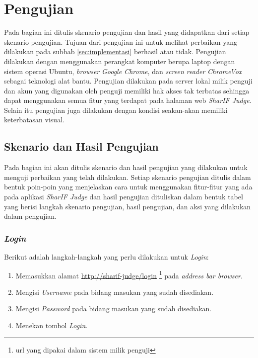 \section{Pengujian}
\label{sec:pengujian}
Pada bagian ini ditulis skenario pengujian dan hasil yang didapatkan dari setiap skenario pengujian. Tujuan dari pengujian ini untuk melihat perbaikan yang dilakukan pada subbab \ref{sec:implementasi} berhasil atau tidak. Pengujian dilakukan dengan menggunakan perangkat komputer berupa laptop dengan sistem operasi Ubuntu, \textit{browser} \textit{Google Chrome}, dan \textit{screen reader} \textit{ChromeVox} sebagai teknologi alat bantu. Pengujian dilakukan pada server lokal milik penguji dan akun yang digunakan oleh penguji memiliki hak akses tak terbatas sehingga dapat menggunakan semua fitur yang terdapat pada halaman web \textit{SharIF Judge}. Selain itu pengujian juga dilakukan dengan kondisi seakan-akan memiliki keterbatasan visual.

\subsection{Skenario dan Hasil Pengujian}
\label{subsec:skenario_pengujian}
Pada bagian ini akan ditulis skenario dan hasil pengujian yang dilakukan untuk menguji perbaikan yang telah dilakukan. Setiap skenario pengujian ditulis dalam bentuk poin-poin yang menjelaskan cara untuk menggunakan fitur-fitur yang ada pada aplikasi \textit{SharIF Judge} dan hasil pengujian dituliskan dalam bentuk tabel yang berisi langkah skenario pengujian, hasil pengujian, dan aksi yang dilakukan dalam pengujian.

\subsubsection{\textit{Login}}
\label{subsubsec:skenario_login}
Berikut adalah langkah-langkah yang perlu dilakukan untuk \textit{Login}:

\begin{enumerate}
	\item Memasukkan alamat \url{http://sharif-judge/login} \footnote{url yang dipakai dalam sistem milik penguji} pada \textit{address bar browser}.
	\item Mengisi \textit{Username} pada bidang masukan yang sudah disediakan.
	\item Mengisi \textit{Password} pada bidang masukan yang sudah disediakan.
	\item Menekan tombol \textit{Login}.
\end{enumerate}

